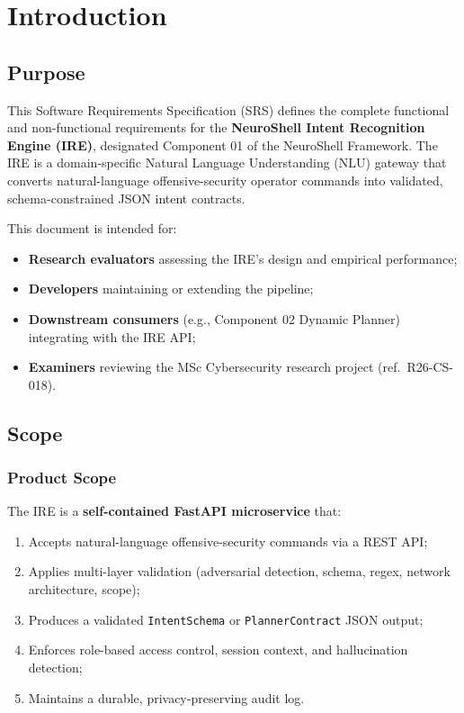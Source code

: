 ﻿\documentclass[10pt,journal,onecolumn]{IEEEtran}
\begin{document}
\tableofcontents

\newpage

\section{Introduction}

\subsection{Purpose}
This Software Requirements Specification (SRS) defines the complete functional and non-functional requirements for the \textbf{NeuroShell Intent Recognition Engine (IRE)}, designated Component 01 of the NeuroShell Framework. The IRE is a domain-specific Natural Language Understanding (NLU) gateway that converts natural-language offensive-security operator commands into validated, schema-constrained JSON intent contracts.

This document is intended for:
\begin{itemize}
\item \textbf{Research evaluators} assessing the IRE's design and empirical performance;
\item \textbf{Developers} maintaining or extending the pipeline;
\item \textbf{Downstream consumers} (e.g., Component 02 Dynamic Planner) integrating with the IRE API;
\item \textbf{Examiners} reviewing the MSc Cybersecurity research project (ref.~R26-CS-018).
\end{itemize}

\subsection{Scope}

\subsubsection{Product Scope}
The IRE is a \textbf{self-contained FastAPI microservice} that:
\begin{enumerate}
\item Accepts natural-language offensive-security commands via a REST API;
\item Applies multi-layer validation (adversarial detection, schema, regex, network architecture, scope);
\item Produces a validated \texttt{IntentSchema} or \texttt{PlannerContract} JSON output;
\item Enforces role-based access control, session context, and hallucination detection;
\item Maintains a durable, privacy-preserving audit log.
\end{enumerate}
\end{document}
